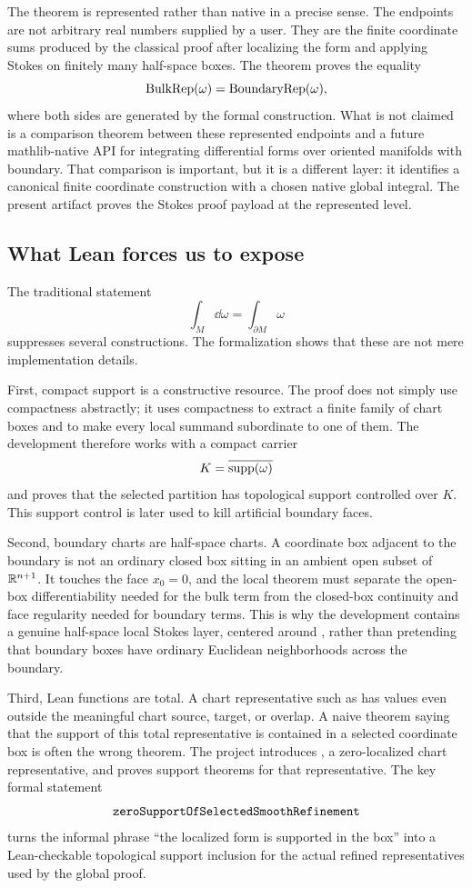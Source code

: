The theorem is represented rather than native in a precise sense.  The
endpoints are not arbitrary real numbers supplied by a user.  They are the
finite coordinate sums produced by the classical proof after localizing the
form and applying Stokes on finitely many half-space boxes.  The theorem proves
the equality
\[
  \operatorname{BulkRep}(\omega) = \operatorname{BoundaryRep}(\omega),
\]
where both sides are generated by the formal construction.  What is not claimed
is a comparison theorem between these represented endpoints and a future
mathlib-native API for integrating differential forms over oriented manifolds
with boundary.  That comparison is important, but it is a different layer: it
identifies a canonical finite coordinate construction with a chosen native
global integral.  The present artifact proves the Stokes proof payload at the
represented level.

\subsection{What Lean forces us to expose}

The traditional statement
\[
  \int_M \dd\omega = \int_{\partial M} \omega
\]
suppresses several constructions.  The formalization shows that these are not
mere implementation details.

First, compact support is a constructive resource.  The proof does not simply
use compactness abstractly; it uses compactness to extract a finite family of
chart boxes and to make every local summand subordinate to one of them.  The
development therefore works with a compact carrier
\[
  K = \overline{\operatorname{supp}(\omega)}
\]
and proves that the selected partition has topological support controlled over
\(K\).  This support control is later used to kill artificial boundary faces.

Second, boundary charts are half-space charts.  A coordinate box adjacent to
the boundary is not an ordinary closed box sitting in an ambient open subset of
\(\mathbb{R}^{n+1}\).  It touches the face \(x_0=0\), and the local theorem must
separate the open-box differentiability needed for the bulk term from the
closed-box continuity and face regularity needed for boundary terms.  This is
why the development contains a genuine half-space local Stokes layer, centered
around , rather than pretending that
boundary boxes have ordinary Euclidean neighborhoods across the boundary.

Third, Lean functions are total.  A chart representative such as
 has values even outside the meaningful chart
source, target, or overlap.  A naive theorem saying that the support of this
total representative is contained in a selected coordinate box is often the
wrong theorem.  The project introduces
, a zero-localized chart
representative, and proves support theorems for that representative.  The key
formal statement
\[
\code{zeroSupportOfSelectedSmoothRefinement}
\]
turns the informal phrase ``the localized form is supported in the box'' into a
Lean-checkable topological support inclusion for the actual refined
representatives used by the global proof.

